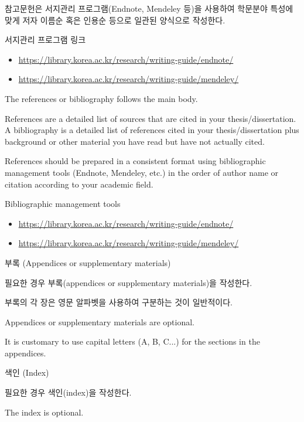 \documentclass[11pt]{report}
\numberwithin{figure}{section}
\theoremstyle{plain}
\theoremstyle{definition}
\theoremstyle{corollary}
\theoremstyle{definition}
\theoremstyle{plain}
\theoremstyle{definition}
\theoremstyle{plain}
\begin{document}
참고문헌은 서지관리 프로그램(Endnote, Mendeley 등)을 사용하여 학문분야 특성에 맞게 저자 이름순 혹은 인용순 등으로 일관된 양식으로 작성한다.

서지관리 프로그램 링크
\begin{itemize}
\item\url{https://library.korea.ac.kr/research/writing-guide/endnote/}
\item\url{https://library.korea.ac.kr/research/writing-guide/mendeley/}
\end{itemize}

The references or bibliography follows the main body. 

References are a detailed list of sources that are cited in your thesis/dissertation.
A bibliography is a detailed list of references cited in your thesis/dissertation plus background or other material you have read but have not actually cited.

References should be prepared in a consistent format using bibliographic management tools (Endnote, Mendeley, etc.) in the order of author name or citation according to your academic field.

Bibliographic management tools
\begin{itemize}
\item\url{https://library.korea.ac.kr/research/writing-guide/endnote/}
\item\url{https://library.korea.ac.kr/research/writing-guide/mendeley/}
\end{itemize}

\newpage
\begin{center}
\large
부록 (Appendices or supplementary materials)
\end{center}
\normalsize
필요한 경우 부록(appendices or supplementary materials)을 작성한다.

부록의 각 장은 영문 알파벳을 사용하여 구분하는 것이 일반적이다.

Appendices or supplementary materials are optional.

It is customary to use capital letters (A, B, C...) for the sections in the appendices.

\newpage
\begin{center}
\large
색인 (Index)

\end{center}
\normalsize
필요한 경우 색인(index)을 작성한다.

The index is optional.




%
%
%

%
%
%



%
%
%
%
%
\end{document}
